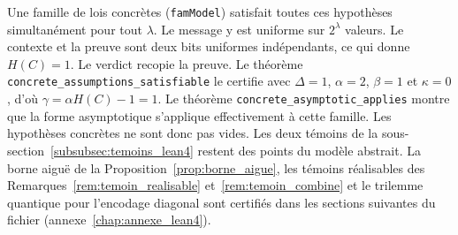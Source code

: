 \begin{sloppypar}
Une famille de lois concr\`etes (\texttt{famModel}) satisfait toutes ces hypoth\`eses
simultan\'ement pour tout $\lambda$. Le message y est uniforme sur $2^\lambda$ valeurs.
Le contexte et la preuve sont deux bits uniformes ind\'ependants, ce qui donne
$H(C) = 1$. Le verdict recopie la preuve. Le th\'eor\`eme
\texttt{concrete\_assumptions\_satisfiable} le certifie avec $\Delta = 1$, $\alpha = 2$,
$\beta = 1$ et $\kappa = 0$, d'o\`u $\gamma = \alpha H(C) - 1 = 1$.
Le th\'eor\`eme \texttt{concrete\_asymptotic\_applies} montre que la forme asymptotique
s'applique effectivement \`a cette famille. Les hypoth\`eses concr\`etes ne sont donc pas
vides. Les deux t\'emoins de la sous-section~\ref{subsubsec:temoins_lean4} restent des
points du mod\`ele abstrait. La borne aigu\"e de la Proposition~\ref{prop:borne_aigue}, les
t\'emoins r\'ealisables des Remarques~\ref{rem:temoin_realisable} et~\ref{rem:temoin_combine} et
le trilemme quantique pour l'encodage diagonal sont certifi\'es dans les sections suivantes du
fichier (annexe~\ref{chap:annexe_lean4}).
\end{sloppypar}

